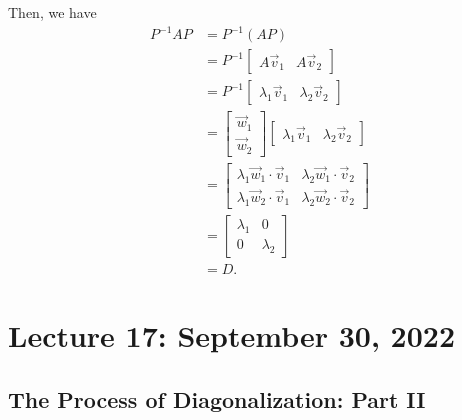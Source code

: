         Then, we have
        \begin{align*}
            P^{-1}AP&=P^{-1}(AP) \\
            &=P^{-1}\begin{bmatrix} A\vec{v}_1 & A\vec{v}_2 \end{bmatrix} \\
            &=P^{-1}\begin{bmatrix} \lambda_1\vec{v}_1 & \lambda_2\vec{v}_2 \end{bmatrix} \\
            &=\begin{bmatrix} \vec{w}_1 \\ \vec{w}_2 \end{bmatrix}\begin{bmatrix} \lambda_1\vec{v}_1 & \lambda_2\vec{v}_2 \end{bmatrix} \\
            &=\begin{bmatrix} \lambda_1\vec{w}_1\cdot\vec{v}_1 & \lambda_2\vec{w}_1\cdot\vec{v}_2 \\ \lambda_1\vec{w}_2\cdot\vec{v}_1 & \lambda_2\vec{w}_2\cdot\vec{v}_2 \end{bmatrix} \\
            &=\begin{bmatrix} \lambda_1 & 0 \\ 0 & \lambda_2 \end{bmatrix} \\
            &=D.
        \end{align*}

\pagebreak

\section{Lecture 17: September 30, 2022}

    \subsection{The Process of Diagonalization: Part II}

